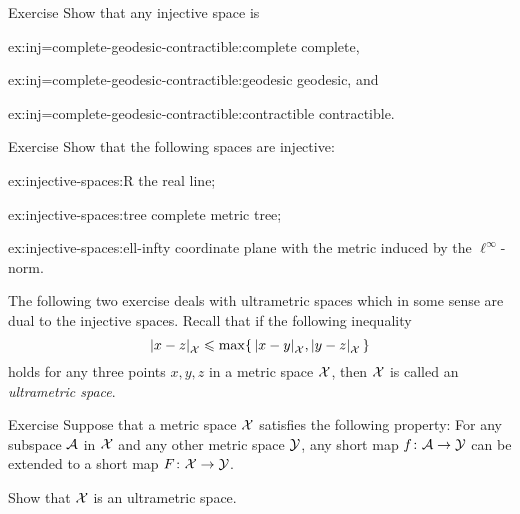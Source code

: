 \begin{thm}{Exercise}\label{ex:inj=complete-geodesic-contractible}
Show that any injective space is 
\begin{multicols}{3}

\begin{subthm}{ex:inj=complete-geodesic-contractible:complete}
complete,
\end{subthm}

\begin{subthm}{ex:inj=complete-geodesic-contractible:geodesic}
geodesic, and
\end{subthm}

\begin{subthm}{ex:inj=complete-geodesic-contractible:contractible}
contractible.
\end{subthm}

\end{multicols}

\end{thm}


\begin{thm}{Exercise}\label{ex:injective-spaces}
Show that the following spaces are injective:
\begin{subthm}{ex:injective-spaces:R}
the real line;
\end{subthm}


\begin{subthm}{ex:injective-spaces:tree}
complete metric tree;
\end{subthm}

\begin{subthm}{ex:injective-spaces:ell-infty}
coordinate plane with the metric induced by the $\ell^\infty$-norm.
\end{subthm}

\end{thm}

The following two exercise deals with ultrametric spaces which in some sense are dual to the injective spaces. 
Recall that if the following inequality
\[\dist{x}{z}{\spc{X}}
\le
\max\{\,\dist{x}{y}{\spc{X}},\dist{y}{z}{\spc{X}}\,\}\]
holds for any three points $x,y,z$ in a metric space $\mathcal{X}$,
then $\mathcal{X}$ is called an \emph{ultrametric space}.

\begin{thm}{Exercise}\label{ex:ultrametric}
Suppose that a metric space $\mathcal{X}$ satisfies the following property:
For any subspace $\mathcal{A}$ in $\mathcal{X}$ and any other metric space $\mathcal{Y}$, any short map $f\colon\mathcal{A}\to \mathcal{Y}$ can be extended to a short map $F\colon\mathcal{X}\to \mathcal{Y}$.

Show that $\mathcal{X}$ is an ultrametric space.
\end{thm}


